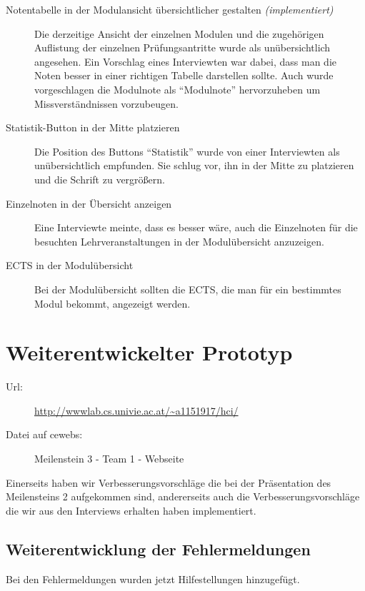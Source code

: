 \documentclass[a4paper,10pt]{scrartcl}
\begin{document}
\begin{description}
\item[Notentabelle in der Modulansicht übersichtlicher gestalten \textit{(implementiert)}] Die derzeitige Ansicht der einzelnen Modulen und die zugehörigen Auflistung der einzelnen Prüfungsantritte wurde als unübersichtlich angesehen. Ein Vorschlag eines Interviewten war dabei, dass man die Noten besser in einer richtigen Tabelle darstellen sollte. Auch wurde vorgeschlagen die Modulnote als ``Modulnote'' hervorzuheben um Missverständnissen vorzubeugen.

\item[Statistik-Button in der Mitte platzieren]
Die Position des Buttons ``Statistik'' wurde von einer Interviewten als unübersichtlich empfunden. Sie schlug vor, ihn in der Mitte zu platzieren und die Schrift zu vergrößern.

\item[Einzelnoten in der Übersicht anzeigen]
Eine Interviewte meinte, dass es besser wäre, auch die Einzelnoten für die besuchten Lehrveranstaltungen in der Modulübersicht anzuzeigen. 

\item[ECTS in der Modulübersicht]
Bei der Modulübersicht sollten die ECTS, die man für ein bestimmtes Modul bekommt, angezeigt werden.  
 
\end{description}

\section{Weiterentwickelter Prototyp}

\begin{description}
 \item[Url:] \url{http://wwwlab.cs.univie.ac.at/~a1151917/hci/}
 \item[Datei auf cewebs:]Meilenstein 3 - Team 1 - Webseite
\end{description}

Einerseits haben wir Verbesserungsvorschläge die bei der Präsentation des Meilensteins 2 aufgekommen sind, andererseits auch
die Verbesserungsvorschläge die wir aus den Interviews erhalten haben implementiert.

\subsection{Weiterentwicklung der Fehlermeldungen}

Bei den Fehlermeldungen wurden jetzt Hilfestellungen hinzugefügt.
\end{document}
